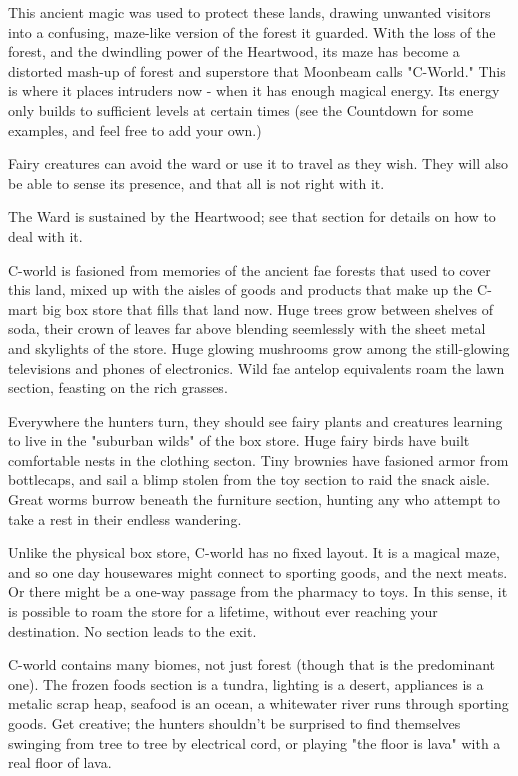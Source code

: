 \documentclass{motw}
\begin{document}


This ancient magic was used to protect these lands, drawing unwanted visitors into a confusing, maze-like version of the forest it guarded.  With the loss of the forest, and the dwindling power of the Heartwood, its maze has become a distorted mash-up of forest and superstore that Moonbeam calls "C-World."  This is where it places intruders now - when it has enough magical energy.  Its energy only builds to sufficient levels at certain times (see the Countdown for some examples, and feel free to add your own.)

Fairy creatures can avoid the ward or use it to travel as they wish.  They will also be able to sense its presence, and that all is not right with it.

The Ward is sustained by the Heartwood; see that section for details on how to deal with it.


C-world is fasioned from memories of the ancient fae forests that used to cover this land, mixed up with the aisles of goods and products that make up the C-mart big box store that fills that land now.  Huge trees grow between shelves of soda, their crown of leaves far above blending seemlessly with the sheet metal and skylights of the store.  Huge glowing mushrooms grow among the still-glowing televisions and phones of electronics.  Wild fae antelop equivalents roam the lawn section, feasting on the rich grasses.

Everywhere the hunters turn, they should see fairy plants and creatures learning to live in the "suburban wilds" of the box store.  Huge fairy birds have built comfortable nests in the clothing secton.  Tiny brownies have fasioned armor from bottlecaps, and sail a blimp stolen from the toy section to raid the snack aisle.  Great worms burrow beneath the furniture section, hunting any who attempt to take a rest in their endless wandering.

Unlike the physical box store, C-world has no fixed layout.  It is a magical maze, and so one day housewares might connect to sporting goods, and the next meats.  Or there might be a one-way passage from the pharmacy to toys.  In this sense, it is possible to roam the store for a lifetime, without ever reaching your destination.  No section leads to the exit.

C-world contains many biomes, not just forest (though that is the predominant one).  The frozen foods section is a tundra, lighting is a desert, appliances is a metalic scrap heap, seafood is an ocean, a whitewater river runs through sporting goods.  Get creative; the hunters shouldn't be surprised to find themselves swinging from tree to tree by electrical cord, or playing "the floor is lava" with a real floor of lava.
\end{document}
